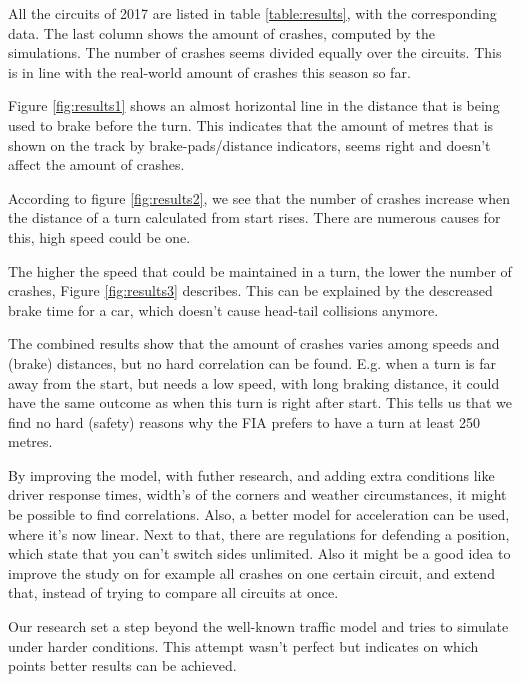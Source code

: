 All the circuits of 2017 are listed in table \ref{table:results}, with the corresponding data. The last column shows the amount of crashes, computed by the simulations. The number of crashes seems divided equally over the circuits. This is in line with the real-world amount of crashes this season so far.

Figure \ref{fig:results1} shows an almost horizontal line in the distance that is being used to brake before the turn. This indicates that the amount of metres that is shown on the track by brake-pads/distance indicators, seems right and doesn't affect the amount of crashes.

According to figure \ref{fig:results2}, we see that the number of crashes increase when the distance of a turn calculated from start rises. There are numerous causes for this, high speed could be one.

The higher the speed that could be maintained in a turn, the lower the number of crashes, Figure \ref{fig:results3} describes. This can be explained by the descreased brake time for a car, which doesn't cause head-tail collisions anymore.

The combined results show that the amount of crashes varies among speeds and (brake) distances, but no hard correlation can be found. E.g. when a turn is far away from the start, but needs a low speed, with long braking distance, it could have the same outcome as when this turn is right after start. This tells us that we find no hard (safety) reasons why the FIA prefers to have a turn at least 250 metres.

By improving the model, with futher research, and adding extra conditions like driver response times, width's of the corners and weather circumstances, it might be possible to find correlations. Also, a better model for acceleration can be used, where it's now linear. Next to that, there are regulations for defending a position, which state that you can't switch sides unlimited. Also it might be a good idea to improve the study on for example all crashes on one certain circuit, and extend that, instead of trying to compare all circuits at once.

Our research set a step beyond the well-known traffic model and tries to simulate under harder conditions. This attempt wasn't perfect but indicates on which points better results can be achieved.
